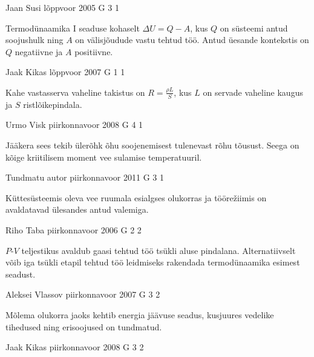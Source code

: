 \documentclass[11pt, twoside]{article}
\begin{document}
{%
{Jaan Susi} %
{lõppvoor} %
{2005} %
{G 3} %
{1} %
{

\ifHint
Termodünaamika I seaduse kohaselt $\Delta U = Q - A$, kus $Q$ on süsteemi antud soojushulk ning $A$ on välisjõudude vastu tehtud töö. Antud üesande kontekstis on $Q$ negatiivne ja $A$ positiivne.
\fi
}

{Jaak Kikas} %
{lõppvoor} %
{2007} %
{G 1} %
{1} %
{

\ifHint
Kahe vastasserva vaheline takistus on $R = \frac{\rho L}{S}$, kus $L$ on servade vaheline kaugus ja $S$ ristlõikepindala.
\fi
}

{Urmo Visk} %
{piirkonnavoor} %
{2008} %
{G 4} %
{1} %
{

\ifHint
Jääkera sees tekib ülerõhk õhu soojenemisest tulenevast rõhu tõusust. Seega on kõige kriitilisem moment vee sulamise temperatuuril.
\fi
}

{Tundmatu autor} %
{piirkonnavoor} %
{2011} %
{G 3} %
{1} %
{

\ifHint
Küttesüsteemis oleva vee ruumala esialgses olukorras ja töörežiimis on avaldatavad ülesandes antud valemiga.
\fi
}

{Riho Taba} %
{piirkonnavoor} %
{2006} %
{G 2} %
{2} %
{

\ifHint
$P$-$V$ teljestikus avaldub gaasi tehtud töö tsükli aluse pindalana. Alternatiivselt võib iga tsükli etapil tehtud töö leidmiseks rakendada termodünaamika esimest seadust.
\fi
}

{Aleksei Vlassov} %
{piirkonnavoor} %
{2007} %
{G 3} %
{2} %
{

\ifHint
Mõlema olukorra jaoks kehtib energia jäävuse seadus, kusjuures vedelike tihedused ning erisoojused on tundmatud.
\fi
}

{Jaak Kikas} %
{piirkonnavoor} %
{2008} %
{G 3} %
{2} %
{

}}
\end{document}
